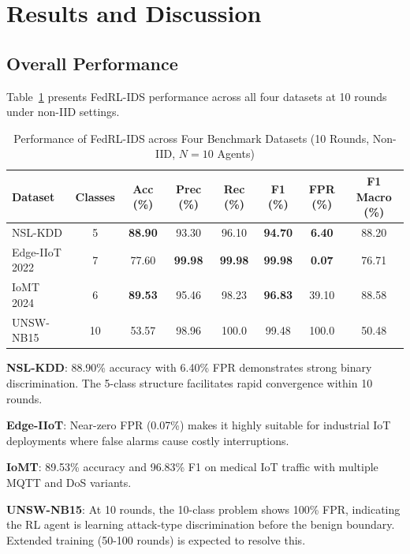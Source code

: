 \documentclass[conference]{IEEEtran}
\begin{document}
\section{Results and Discussion}
\label{sec:results}

\subsection{Overall Performance}

Table~\ref{tab:results_main} presents FedRL-IDS performance across all four datasets at 10 rounds under non-IID settings.

\begin{table}[t]
\centering
\caption{Performance of FedRL-IDS across Four Benchmark Datasets (10 Rounds, Non-IID, $N=10$ Agents)}
\label{tab:results_main}
\begin{tabular}{lccccccc}
\toprule
\textbf{Dataset} & \textbf{Classes} & \textbf{Acc (\%)} & \textbf{Prec (\%)} & \textbf{Rec (\%)} & \textbf{F1 (\%)} & \textbf{FPR (\%)} & \textbf{F1 Macro (\%)} \\
\midrule
NSL-KDD & 5 & \textbf{88.90} & 93.30 & 96.10 & \textbf{94.70} & \textbf{6.40} & 88.20 \\
Edge-IIoT 2022 & 7 & 77.60 & \textbf{99.98} & \textbf{99.98} & \textbf{99.98} & \textbf{0.07} & 76.71 \\
IoMT 2024 & 6 & \textbf{89.53} & 95.46 & 98.23 & \textbf{96.83} & 39.10 & 88.58 \\
UNSW-NB15 & 10 & 53.57 & 98.96 & 100.0 & 99.48 & 100.0 & 50.48 \\
\bottomrule
\end{tabular}
\end{table}

\textbf{NSL-KDD}: 88.90\% accuracy with 6.40\% FPR demonstrates strong binary discrimination. The 5-class structure facilitates rapid convergence within 10 rounds.

\textbf{Edge-IIoT}: Near-zero FPR (0.07\%) makes it highly suitable for industrial IoT deployments where false alarms cause costly interruptions.

\textbf{IoMT}: 89.53\% accuracy and 96.83\% F1 on medical IoT traffic with multiple MQTT and DoS variants.

\textbf{UNSW-NB15}: At 10 rounds, the 10-class problem shows 100\% FPR, indicating the RL agent is learning attack-type discrimination before the benign boundary. Extended training (50-100 rounds) is expected to resolve this.
\end{document}
